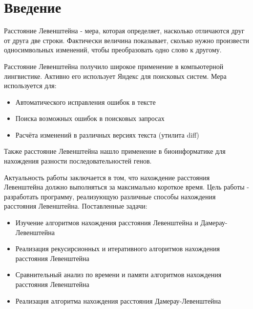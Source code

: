 \newpage
{}

\chapter*{Введение}
Расстояние Левенштейна\cite{Levenshtein} - мера, которая определяет, насколько отличаются друг от друга две строки. Фактически величина показывает, сколько нужно произвести односимвольных изменений, чтобы преобразовать одно слово к другому.

Расстояние Левенштейна получило широкое применение в компьютерной лингвистике. Активно его использует Яндекс\cite{yandex} для поисковых систем. Мера используется для:
\begin{itemize}
    \item Автоматического исправления ошибок в тексте
    \item Поиска возможных ошибок в поисковых запросах
    \item Расчёта изменений в различных версиях текста (утилита diff)
\end{itemize}

Также расстояние Левенштейна нашло применение в биоинформатике для нахождения разности последовательностей генов.

Актуальность работы заключается в том, что нахождение расстояния Левенштейна должно выполняться за максимально короткое время.
Цель работы - разработать программу, реализующую различные способы нахождения расстояния Левенштейна. 
Поставленные задачи:
\begin{itemize}
\item Изучение алгоритмов нахождения расстояния Левенштейна и Дамерау-Левенштейна
\item Реализация рекусирсионных и итеративного алгоритмов нахождения расстояния Левенштейна
\item Сравнительный анализ по времени и памяти алгоритмов нахождения расстояния Левенштейна
\item Реализация алгоритма нахождения расстояния Дамерау-Левенштейна
\end{itemize}